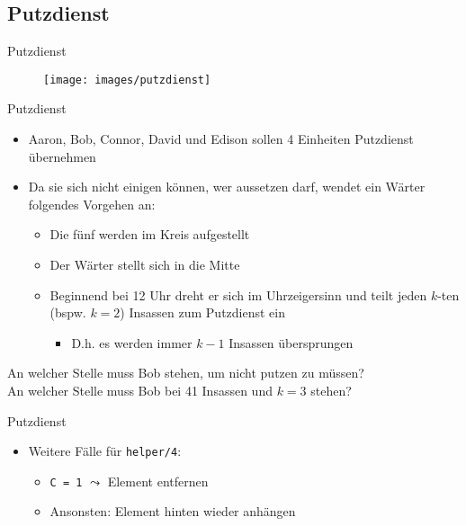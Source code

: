 \documentclass{beamer}
\begin{document}

\subsection{Putzdienst}

\begin{frame}{Putzdienst}
	\begin{figure}
		\texttt{[image: images/putzdienst]}
	\end{figure}
\end{frame}

\begin{frame}{Putzdienst}
	\begin{itemize}
		\item Aaron, Bob, Connor, David und Edison sollen 4 Einheiten Putzdienst übernehmen
		\item Da sie sich nicht einigen können, wer aussetzen darf, wendet ein Wärter folgendes Vorgehen an:
		\begin{itemize}
			\item Die fünf werden im Kreis aufgestellt
			\item Der Wärter stellt sich in die Mitte
			\item Beginnend bei 12 Uhr dreht er sich im Uhrzeigersinn und teilt jeden $k$-ten (bspw. $k = 2$) Insassen zum Putzdienst ein
			\begin{itemize}
				\item D.h. es werden immer $k - 1$ Insassen übersprungen
			\end{itemize}
		\end{itemize}
	\end{itemize}

	An welcher Stelle muss Bob stehen, um nicht putzen zu müssen?\\
	\pause
	An welcher Stelle muss Bob bei 41 Insassen und $k = 3$ stehen?
\end{frame}

\begin{frame}{Putzdienst}

	\begin{itemize}
		\item Weitere Fälle für \texttt{helper/4}:
		\begin{itemize}
			\item \texttt{C = 1} $\leadsto$ Element entfernen
			\item Ansonsten: Element hinten wieder anhängen
		\end{itemize}
	\end{itemize}
\end{frame}
\end{document}
